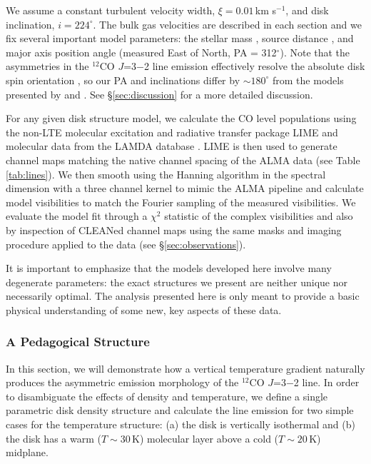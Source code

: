 We assume a constant turbulent velocity width, $\xi=0.01$\,km s$^{-1}$, and disk
inclination, $i=224^\circ$.  The bulk gas velocities are described in each 
section and we fix several important model parameters: the stellar mass 
\citep[$M_\ast = 2.3$\,M$_\odot$;][]{natta04}, source distance 
\citep[$d=122$\,pc;][]{vandenancker98}, and major axis position angle 
(measured East of North, PA = 312$^\circ$).  Note that the asymmetries in the 
$^{12}$CO $J$=3$-$2 line emission effectively resolve the absolute disk spin 
orientation \citep{pietu07}, so our PA and inclinations differ by 
$\sim 180^\circ$ from the models presented by \citet{isella07} and 
\citet{qi11}.  See \S\ref{sec:discussion} for a more detailed discussion.

For any given disk structure model, we calculate the CO level populations using 
the non-LTE molecular excitation and radiative transfer package LIME 
\citep{brinch10} and molecular data from the LAMDA database 
\citep{schoier05,yang10}.  LIME is then used to generate channel maps matching 
the native channel spacing of the ALMA data (see Table \ref{tab:lines}).  We
then smooth using the Hanning algorithm in the spectral dimension with a three 
channel kernel to mimic the ALMA pipeline \citep[see 
\S\ref{sec:discussion};][]{lundgren12} and calculate model visibilities to match
the Fourier sampling of the measured visibilities.  We evaluate the model fit 
through a $\chi^2$ statistic of the complex visibilities and also by inspection 
of CLEANed channel maps using the same masks and imaging procedure applied to 
the data (see \S\ref{sec:observations}).

It is important to emphasize that the models developed here involve many 
degenerate parameters: the exact structures we present are neither unique nor 
necessarily optimal.  The analysis presented here is only meant to provide a 
basic physical understanding of some new, key aspects of these data.

\subsubsection{A Pedagogical Structure}\label{sec:pedagogic}

In this section, we will demonstrate how a vertical temperature gradient 
naturally produces the asymmetric emission morphology of the $^{12}$CO $J$=3$-$2
line.  In order to disambiguate the effects of density and temperature, we 
define a single parametric disk density structure and calculate the line 
emission for two simple cases for the temperature structure:
(a) the disk is vertically isothermal and (b) the disk has a 
warm ($T\sim30$\,K) molecular layer above a cold ($T\sim20$\,K) midplane.

